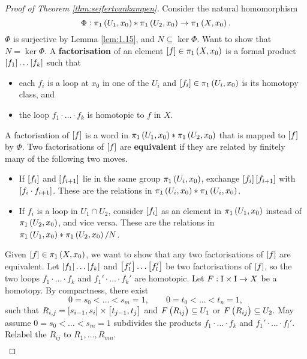 \begin{proof}[Proof of Theorem \ref{thm:seifertvankampen}]
Consider the natural homomorphism
$$ \Phi : \pi_1\br{U_1, x_0} * \pi_1\br{U_2, x_0} \to \pi_1\br{X, x_0}. $$
$ \Phi $ is surjective by Lemma \ref{lem:1.15}, and $ N \subseteq \ker \Phi $. Want to show that $ N = \ker \Phi $. A \textbf{factorisation} of an element $ \sbr{f} \in \pi_1\br{X, x_0} $ is a formal product $ \sbr{f_1} \dots \sbr{f_k} $ such that
\begin{itemize}
\item each $ f_i $ is a loop at $ x_0 $ in one of the $ U_i $ and $ \sbr{f_i} \in \pi_1\br{U_i, x_0} $ is its homotopy class, and
\item the loop $ f_1 \cdot \dots \cdot f_k $ is homotopic to $ f $ in $ X $.
\end{itemize}
A factorisation of $ \sbr{f} $ is a word in $ \pi_1\br{U_1, x_0} * \pi_1\br{U_2, x_0} $ that is mapped to $ \sbr{f} $ by $ \Phi $. Two factorisations of $ \sbr{f} $ are \textbf{equivalent} if they are related by finitely many of the following two moves.
\begin{itemize}
\item If $ \sbr{f_i} $ and $ \sbr{f_{i + 1}} $ lie in the same group $ \pi_1\br{U_i, x_0} $, exchange $ \sbr{f_i}\sbr{f_{i + 1}} $ with $ \sbr{f_i \cdot f_{i + 1}} $. These are the relations in $ \pi_1\br{U_i, x_0} * \pi_1\br{U_i, x_0} $.
\item If $ f_i $ is a loop in $ U_1 \cap U_2 $, consider $ \sbr{f_i} $ as an element in $ \pi_1\br{U_1, x_0} $ instead of $ \pi_1\br{U_2, x_0} $, and vice versa. These are the relations in $ \pi_1\br{U_1, x_0} * \pi_1\br{U_2, x_0} / N $.
\end{itemize}
Given $ \sbr{f} \in \pi_1\br{X, x_0} $, we want to show that any two factorisations of $ \sbr{f} $ are equivalent. Let $ \sbr{f_1} \dots \sbr{f_k} $ and $ \sbr{f_1'} \dots \sbr{f_l'} $ be two factorisations of $ \sbr{f} $, so the two loops $ f_1 \cdot \dots \cdot f_k $ and $ f_1' \cdot \dots \cdot f_k' $ are homotopic. Let $ F : \I \times \I \to X $ be a homotopy. By compactness, there exist
$$ 0 = s_0 < \dots < s_m = 1, \qquad 0 = t_0 < \dots < t_n = 1, $$
such that $ R_{i, j} = \sbr{s_{i - 1}, s_i} \times \sbr{t_{j - 1}, t_j} $ and $ F\br{R_{ij}} \subseteq U_1 $ or $ F\br{R_{ij}} \subseteq U_2 $. May assume $ 0 = s_0 < \dots < s_m = 1 $ subdivides the products $ f_1 \cdot \dots \cdot f_k $ and $ f_1' \cdot \dots \cdot f_l' $. Relabel the $ R_{ij} $ to $ R_1, \dots, R_{mn} $.
$$
\begin{array}{|c|c|c|}

\end{array}$$
\end{proof}
